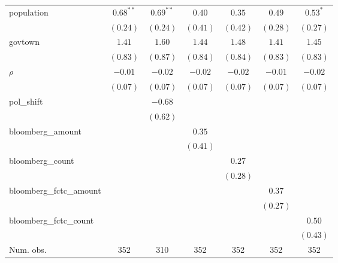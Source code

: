 \begin{table}[!h]
\begin{center}
\begin{tabular}{l c c c c c c }
population              & $0.68^{**}$  & $0.69^{**}$  & $0.40$       & $0.35$       & $0.49$       & $0.53^{*}$   \\
                        & $(0.24)$     & $(0.24)$     & $(0.41)$     & $(0.42)$     & $(0.28)$     & $(0.27)$     \\
govtown                 & $1.41$       & $1.60$       & $1.44$       & $1.48$       & $1.41$       & $1.45$       \\
                        & $(0.83)$     & $(0.87)$     & $(0.84)$     & $(0.84)$     & $(0.83)$     & $(0.83)$     \\
$\rho$                  & $-0.01$      & $-0.02$      & $-0.02$      & $-0.02$      & $-0.01$      & $-0.02$      \\
                        & $(0.07)$     & $(0.07)$     & $(0.07)$     & $(0.07)$     & $(0.07)$     & $(0.07)$     \\
pol\_shift              &              & $-0.68$      &              &              &              &              \\
                        &              & $(0.62)$     &              &              &              &              \\
bloomberg\_amount       &              &              & $0.35$       &              &              &              \\
                        &              &              & $(0.41)$     &              &              &              \\
bloomberg\_count        &              &              &              & $0.27$       &              &              \\
                        &              &              &              & $(0.28)$     &              &              \\
bloomberg\_fctc\_amount &              &              &              &              & $0.37$       &              \\
                        &              &              &              &              & $(0.27)$     &              \\
bloomberg\_fctc\_count  &              &              &              &              &              & $0.50$       \\
                        &              &              &              &              &              & $(0.43)$     \\
\midrule
Num. obs.               & 352          & 310          & 352          & 352          & 352          & 352          \\

\end{tabular}
\end{center}
\end{table}
